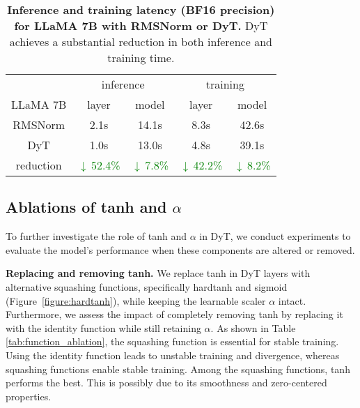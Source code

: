 \documentclass[]{fairmeta}
\newcommand{\tablestyle}[2]{\setlength{\tabcolsep}{#1}\renewcommand{\arraystretch}{#2}\centering\footnotesize}
\renewcommand{\paragraph}[1]{\vspace{1.25mm}\noindent\textbf{#1}}
\newcommand{\betterinv}[1]{\textcolor{green}{$\downarrow\,$#1}}
\begin{document}
\begin{table}[h]
\centering
\tablestyle{6pt}{1.15}
\begin{tabular}{ccccc} 
\toprule
& \multicolumn{2}{c}{inference} & \multicolumn{2}{c}{training} \\
\cmidrule[0.5pt](lr){2-3} \cmidrule[0.5pt](lr){4-5}
LLaMA 7B & layer & model & layer & model \\ 
\midrule
RMSNorm & 2.1s & 14.1s & 8.3s & 42.6s \\
DyT & 1.0s & 13.0s & 4.8s & 39.1s \\
\midrule
reduction & \betterinv{52.4\%} & \betterinv{7.8\%} & \betterinv{42.2\%} & \betterinv{8.2\%}  \\
\midrule
\end{tabular}
\caption{\textbf{Inference and training latency (BF16 precision) for LLaMA 7B with RMSNorm or DyT.} DyT achieves a substantial reduction in both inference and training time.}
\label{table:speed_latency}
\vspace{-0.2in}
\end{table}




\subsection{Ablations of tanh and $\alpha$}


To further investigate the role of tanh and $\alpha$ in DyT, we conduct experiments to evaluate the model’s performance when these components are altered or removed.

\paragraph{Replacing and removing tanh.} We replace tanh in DyT layers with alternative squashing functions, specifically hardtanh and sigmoid (Figure~\ref{figure:hardtanh}), while keeping the learnable scaler $\alpha$ intact. Furthermore, we assess the impact of completely removing tanh by replacing it with the identity function while still retaining $\alpha$.
As shown in Table \ref{tab:function_ablation}, the squashing function is essential for stable training. Using the identity function leads to unstable training and divergence, whereas squashing functions enable stable training. Among the squashing functions, tanh performs the best. This is possibly due to its smoothness and zero-centered properties.
\end{document}
